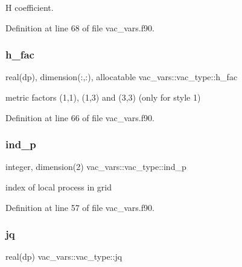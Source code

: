 H coefficient. 



Definition at line 68 of file vac\+\_\+vars.\+f90.

\mbox{\label{structvac__vars_1_1vac__type_abdbf97da81162577af6880aba4e44061}} 
\subsubsection{\texorpdfstring{h\+\_\+fac}{h\_fac}}
{\footnotesize\ttfamily real(dp), dimension(\+:,\+:), allocatable vac\+\_\+vars\+::vac\+\_\+type\+::h\+\_\+fac}



metric factors (1,1), (1,3) and (3,3) (only for style 1) 



Definition at line 66 of file vac\+\_\+vars.\+f90.

\mbox{\label{structvac__vars_1_1vac__type_ae875caaff6d6ddf9bf6abba721f081ec}} 
\subsubsection{\texorpdfstring{ind\+\_\+p}{ind\_p}}
{\footnotesize\ttfamily integer, dimension(2) vac\+\_\+vars\+::vac\+\_\+type\+::ind\+\_\+p}



index of local process in grid 



Definition at line 57 of file vac\+\_\+vars.\+f90.

\mbox{\label{structvac__vars_1_1vac__type_a8cba6ae0e61249966161e44ab1c465fb}} 
\subsubsection{\texorpdfstring{jq}{jq}}
{\footnotesize\ttfamily real(dp) vac\+\_\+vars\+::vac\+\_\+type\+::jq}



